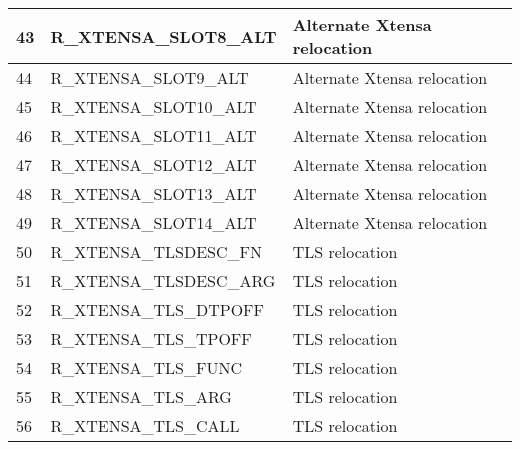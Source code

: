 \begin{longtable}{|p{1cm}|p{6cm}|p{10cm}|}
	43 & R\_XTENSA\_SLOT8\_ALT & Alternate Xtensa relocation \\ \hline
	44 & R\_XTENSA\_SLOT9\_ALT & Alternate Xtensa relocation \\ \hline
	45 & R\_XTENSA\_SLOT10\_ALT & Alternate Xtensa relocation \\ \hline
	46 & R\_XTENSA\_SLOT11\_ALT & Alternate Xtensa relocation \\ \hline
	47 & R\_XTENSA\_SLOT12\_ALT & Alternate Xtensa relocation \\ \hline
	48 & R\_XTENSA\_SLOT13\_ALT & Alternate Xtensa relocation \\ \hline
	49 & R\_XTENSA\_SLOT14\_ALT & Alternate Xtensa relocation \\ \hline
	50 & R\_XTENSA\_TLSDESC\_FN & TLS relocation \\ \hline
	51 & R\_XTENSA\_TLSDESC\_ARG & TLS relocation \\ \hline
	52 & R\_XTENSA\_TLS\_DTPOFF & TLS relocation \\ \hline
	53 & R\_XTENSA\_TLS\_TPOFF & TLS relocation \\ \hline
	54 & R\_XTENSA\_TLS\_FUNC & TLS relocation \\ \hline
	55 & R\_XTENSA\_TLS\_ARG & TLS relocation \\ \hline
	56 & R\_XTENSA\_TLS\_CALL & TLS relocation \\ \hline
\end{longtable}